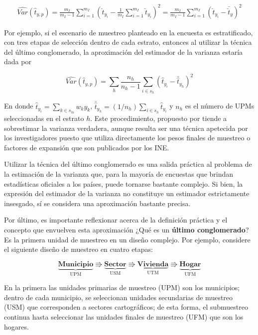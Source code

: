 \documentclass[
  12pt,
  spanish,
]{book}
\begin{document}
\begin{align}
\label{UC}
\widehat{Var}(\hat{t}_{y,p})
=\frac{m_I}{m_I-1}\sum_{i=1}^{m_I}\left( \breve{t}_{y_i} -\frac{1}{m_I}\sum_{i=1}^{m_I}\breve{t}_{y_i} \right)^2 
=\frac{m_I}{m_I-1}\sum_{i=1}^{m_I}\left( \breve{t}_{y_i} - \bar{\breve{t}}_{y} \right)^2
\end{align}

Por ejemplo, si el escenario de muestreo planteado en la encuesta es estratificado, con tres etapas de selección dentro de cada estrato, entonces al utilizar la técnica del último conglomerado, la aproximación del estimador de la varianza estaría dada por

\[
\widehat{Var}(\hat{t}_{y,p}) = 
\sum_h\frac{n_h}{n_h-1}\sum_{i\in s_h}\left(\hat{t}_{y_i}-\bar{\hat{t}}_{y_h}\right)^2
\]

En donde \(\hat{t}_{y_i} = \sum_{k \in s_{hi}} w_k y_k\), \(\bar{\hat{t}}_{y_h}=(1/n_h)\sum_{i \in s_h}\hat{t}_{y_i}\) y \(n_h\) es el número de UPMs seleccionadas en el estrato \(h\). Este procedimiento, propuesto por \citet{hansen1953sample} tiende a sobrestimar la varianza verdadera, aunque resulta ser una técnica apetecida por los investigadores puesto que utiliza directamente los pesos finales de muestreo o factores de expansión que son publicados por los INE.

Utilizar la técnica del último conglomerado es una salida práctica al problema de la estimación de la varianza que, para la mayoría de encuestas que brindan estadísticas oficiales a los países, puede tornarse bastante complejo. Si bien, la expresión del estimador de la varianza no constituye un estimador estrictamente insesgado, sí se considera una aproximación bastante precisa.

Por último, es importante reflexionar acerca de la definición práctica y el concepto que envuelven esta aproximación ¿Qué es un \textbf{último conglomerado}? Es la primera unidad de muestreo en un diseño complejo. Por ejemplo, considere el siguiente diseño de muestreo en cuatro etapas:

\begin{equation*}
\underbrace{\textbf{Municipio}}_{\text{UPM}} \Rrightarrow
\underbrace{\textbf{Sector}}_{\text{USM}} \Rrightarrow
\underbrace{\textbf{Vivienda}}_{\text{UTM}} \Rrightarrow
\underbrace{\textbf{Hogar}}_{\text{UFM}}
\end{equation*}

En la primera las unidades primarias de muestreo (UPM) son los municipios; dentro de cada municipio, se seleccionan unidades secundarias de muestreo (USM) que corresponden a sectores cartográficos; de esta forma, el submuestreo continua hasta seleccionar las unidades finales de muestreo (UFM) que son los hogares.
\end{document}
